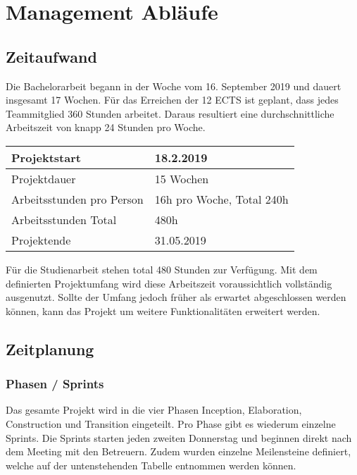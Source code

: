 \section{Management Abläufe}

\subsection{Zeitaufwand}
Die Bachelorarbeit begann in der Woche vom  16. September 2019 und dauert insgesamt 17 Wochen. Für das Erreichen der 12 ECTS ist geplant, dass jedes Teammitglied 360 Stunden arbeitet. Daraus resultiert eine durchschnittliche Arbeitszeit von knapp 24 Stunden pro Woche.

\begin{center}
	\begin{tabular}{| m{5cm} | m{7cm}|}
	\hline
	\textbf{Projektstart} & \textbf{18.2.2019} \\
	\hline
	Projektdauer & 15 Wochen \\
	\hline
	Arbeitsstunden pro Person & 16h pro Woche, Total 240h \\
	\hline
	Arbeitsstunden Total & 480h \\
	\hline
	Projektende & 31.05.2019 \\
	\hline
	\end{tabular}
\end{center}

\noindent Für die Studienarbeit stehen total 480 Stunden zur Verfügung. Mit dem definierten Projektumfang wird diese Arbeitszeit voraussichtlich vollständig ausgenutzt. Sollte der Umfang jedoch früher als erwartet abgeschlossen werden können, kann das Projekt um weitere Funktionalitäten erweitert werden.

\subsection{Zeitplanung}
\subsubsection{Phasen / Sprints}
Das gesamte Projekt wird in die vier Phasen Inception, Elaboration, Construction und Transition eingeteilt. Pro Phase gibt es wiederum einzelne Sprints. Die Sprints starten jeden zweiten Donnerstag und beginnen direkt nach dem Meeting mit den Betreuern. Zudem wurden einzelne Meilensteine definiert, welche auf der untenstehenden Tabelle entnommen werden können.


